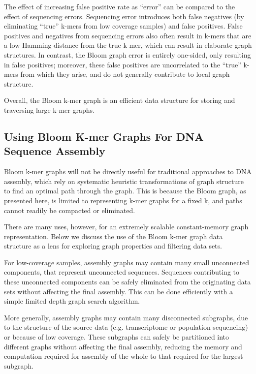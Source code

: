 \documentclass[12pt]{article} \usepackage{simplemargins}
\begin{document}
The effect of increasing false positive rate as ``error'' can be
compared to the effect of sequencing errors.  Sequencing error
introduces both false negatives (by eliminating ``true'' k-mers from
low coverage samples) and false positives.  False positives and
negatives from sequencing errors also often result in k-mers that are
a low Hamming distance from the true k-mer, which can result in
elaborate graph structures.  In contrast, the Bloom graph error is
entirely one-sided, only resulting in false positives; moreover, these
false positives are uncorrelated to the ``true'' k-mers from which
they arise, and do not generally contribute to local graph structure.

Overall, the Bloom k-mer graph is an efficient data structure for
storing and traversing large k-mer graphs.

\subsection{Using Bloom K-mer Graphs For DNA Sequence Assembly}
Bloom k-mer graphs will not be directly useful for traditional
approaches to DNA assembly, which rely on systematic heuristic
transformations of graph structure to find an optimal path through the
graph.  This is because the Bloom graph, as presented here, is limited
to representing k-mer graphs for a fixed k, and paths cannot readily
be compacted or eliminated.

There are many uses, however, for an extremely scalable
constant-memory graph representation.  Below we discuss the use of the
Bloom k-mer graph data structure as a lens for exploring graph
properties and filtering data sets.

For low-coverage samples, assembly graphs may contain many small
unconnected components, that represent unconnected sequences.
Sequences contributing to these unconnected components can be safely
eliminated from the originating data sets without affecting the final
assembly.  This can be done efficiently with a simple limited depth
graph search algorithm.

More generally, assembly graphs may contain many disconnected
subgraphs, due to the structure of the source data (e.g. transcriptome
or population sequencing) or because of low coverage.  These subgraphs
can safely be partitioned into different graphs without affecting the
final assembly, reducing the memory and computation required for
assembly of the whole to that required for the largest subgraph.
\end{document}
